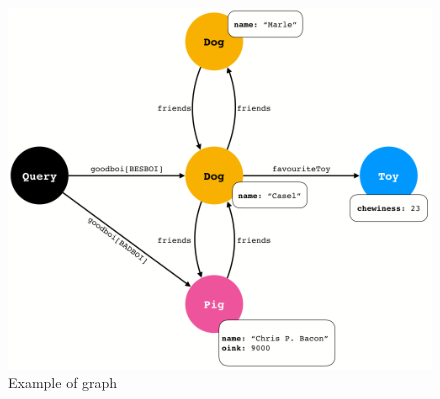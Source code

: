 
\begin{figure}
    \centering
    \includegraphics[scale=0.23]{imgs/graph.png}
    \caption{Example of \gql graph }
    \label{fig:graph_ex}
\end{figure}



